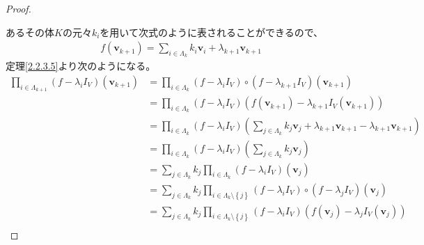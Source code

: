 \documentclass[dvipdfmx]{jsarticle}
\begin{document}
\begin{proof}
\begin{center}
\end{center}
あるその体$K$の元々$k_{i}$を用いて次式のように表されることができるので、
\begin{align*}
f\left( \mathbf{v}_{k + 1} \right) = \sum_{i \in \varLambda_{k}} {k_{i}\mathbf{v}_{i}} + \lambda_{k + 1}\mathbf{v}_{k + 1}
\end{align*}
定理\ref{2.2.3.5}より次のようになる。
\begin{align*}
\prod_{i \in \varLambda_{k + 1}} \left( f - \lambda_{i}I_{V} \right)\left( \mathbf{v}_{k + 1} \right) &= \prod_{i \in \varLambda_{k}} \left( f - \lambda_{i}I_{V} \right) \circ \left( f - \lambda_{k + 1}I_{V} \right)\left( \mathbf{v}_{k + 1} \right)\\
&= \prod_{i \in \varLambda_{k}} \left( f - \lambda_{i}I_{V} \right)\left( f\left( \mathbf{v}_{k + 1} \right) - \lambda_{k + 1}I_{V}\left( \mathbf{v}_{k + 1} \right) \right)\\
&= \prod_{i \in \varLambda_{k}} \left( f - \lambda_{i}I_{V} \right)\left( \sum_{j \in \varLambda_{k}} {k_{j}\mathbf{v}_{j}} + \lambda_{k + 1}\mathbf{v}_{k + 1} - \lambda_{k + 1}\mathbf{v}_{k + 1} \right)\\
&= \prod_{i \in \varLambda_{k}} \left( f - \lambda_{i}I_{V} \right)\left( \sum_{j \in \varLambda_{k}} {k_{j}\mathbf{v}_{j}} \right)\\
&= \sum_{j \in \varLambda_{k}} {k_{j}\prod_{i \in \varLambda_{k}} \left( f - \lambda_{i}I_{V} \right)\left( \mathbf{v}_{j} \right)}\\
&= \sum_{j \in \varLambda_{k}} {k_{j}\prod_{i \in \varLambda_{k} \setminus \left\{ j \right\}} \left( f - \lambda_{i}I_{V} \right) \circ \left( f - \lambda_{j}I_{V} \right)\left( \mathbf{v}_{j} \right)}\\
&= \sum_{j \in \varLambda_{k}} {k_{j}\prod_{i \in \varLambda_{k} \setminus \left\{ j \right\}} \left( f - \lambda_{i}I_{V} \right)\left( f\left( \mathbf{v}_{j} \right) - \lambda_{j}I_{V}\left( \mathbf{v}_{j} \right) \right)}\\

\end{align*}
\end{proof}
\end{document}
